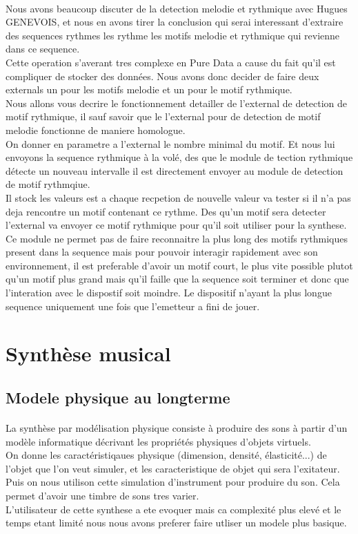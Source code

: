 \documentclass[a4paper, titlepage, oneside, 12pt]{article}%
\begin{document}
\paragraph{}
Nous avons beaucoup discuter de la detection melodie et rythmique avec Hugues GENEVOIS, et nous en avons tirer la conclusion qui serai interessant d'extraire des sequences rythmes les rythme les motifs melodie et rythmique qui revienne dans ce sequence.\\
Cette operation s'averant tres complexe en Pure Data a cause du fait qu'il est compliquer de stocker des données. Nous avons donc decider de faire deux externals un pour les motifs melodie et un pour le motif rythmique.\\
Nous allons vous decrire le fonctionnement detailler de l'external de detection de motif rythmique, il sauf savoir que le l'external pour de detection de motif melodie fonctionne de maniere homologue.\\
On donner en parametre a l'external le nombre minimal du motif. Et nous lui envoyons la sequence rythmique à la volé, des que le module de tection rythmique détecte un nouveau intervalle il est directement envoyer au module de detection de motif rythmqiue.\\
Il stock les valeurs est a chaque recpetion de nouvelle valeur va tester si il n'a pas deja rencontre un motif contenant ce rythme. Des qu'un motif sera detecter l'external va envoyer ce motif rythmique pour qu'il soit utiliser pour la synthese.\\
Ce module ne permet pas de faire reconnaitre la plus long des motifs rythmiques present dans la sequence mais pour pouvoir interagir rapidement avec son environnement, il est preferable d'avoir un motif court, le plus vite possible plutot qu'un motif plus grand mais qu'il faille que la sequence soit terminer et donc que l'interation avec le dispostif soit moindre. Le dispositif n'ayant la plus longue sequence uniquement une fois que l'emetteur a fini de jouer.

\section{Synthèse musical}
\subsection{Modele physique au longterme}
\paragraph{}
La synthèse par modélisation physique consiste à produire des sons à partir d'un modèle informatique décrivant les propriétés physiques d'objets virtuels.\\
On donne les caractéristiqaues physique (dimension, densité, élasticité...) de l'objet que l'on veut simuler, et les caracteristique de objet qui sera l'exitateur. Puis on nous utilison cette  simulation d'instrument pour produire du son. Cela permet d'avoir une timbre de sons tres varier.\\
L'utilisateur de cette synthese a ete evoquer mais ca complexité plus elevé et le temps etant limité nous nous avons preferer faire utliser un modele plus basique.
\end{document}
